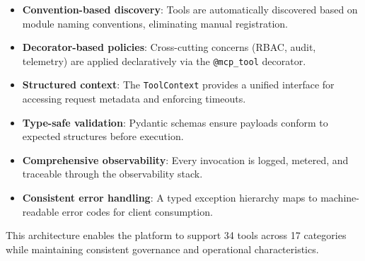 \begin{itemize}
    \item \textbf{Convention-based discovery}: Tools are automatically discovered based on module naming conventions, eliminating manual registration.
    \item \textbf{Decorator-based policies}: Cross-cutting concerns (RBAC, audit, telemetry) are applied declaratively via the \texttt{@mcp\_tool} decorator.
    \item \textbf{Structured context}: The \texttt{ToolContext} provides a unified interface for accessing request metadata and enforcing timeouts.
    \item \textbf{Type-safe validation}: Pydantic schemas ensure payloads conform to expected structures before execution.
    \item \textbf{Comprehensive observability}: Every invocation is logged, metered, and traceable through the observability stack.
    \item \textbf{Consistent error handling}: A typed exception hierarchy maps to machine-readable error codes for client consumption.
\end{itemize}

This architecture enables the platform to support 34 tools across 17 categories while maintaining consistent governance and operational characteristics.
